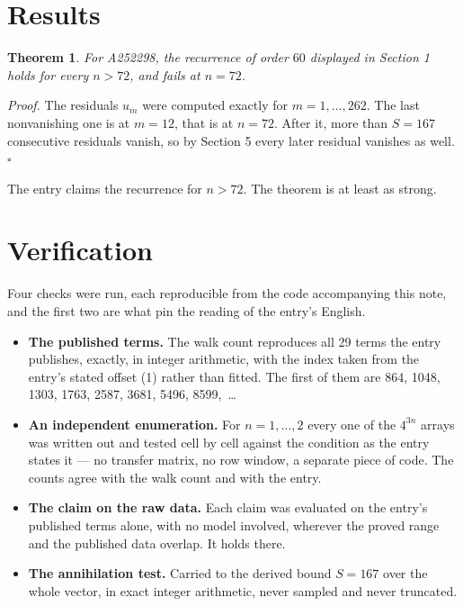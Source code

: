 \documentclass[11pt]{article}
\newtheorem{theorem}{Theorem}
\theoremstyle{definition}
\begin{document}
\section{Results}

\begin{theorem} For A252298, the recurrence of order $60$ displayed in Section 1 holds for every $n > 72$, and fails at $n = 72$.\end{theorem}

{\itshape Proof.} The residuals $u_m$ were computed exactly for $m = 1,\dots,262$. The last nonvanishing one is at $m = 12$, that is at $n = 72$. After it, more than $S = 167$ consecutive residuals vanish, so by Section 5 every later residual vanishes as well. $\square$

The entry claims the recurrence for $n > 72$. The theorem is at least as strong.

\section{Verification}

Four checks were run, each reproducible from the code accompanying this note, and the first two are what pin the reading of the entry's English.

\begin{itemize}

\item {\bfseries The published terms.} The walk count reproduces all 29 terms the entry publishes, exactly, in integer arithmetic, with the index taken from the entry's stated offset (1) rather than fitted. The first of them are 864, 1048, 1303, 1763, 2587, 3681, 5496, 8599,~\dots

\item {\bfseries An independent enumeration.} For $n = 1,\dots,2$ every one of the $4^{3n}$ arrays was written out and tested cell by cell against the condition as the entry states it --- no transfer matrix, no row window, a separate piece of code. The counts agree with the walk count and with the entry.

\item {\bfseries The claim on the raw data.} Each claim was evaluated on the entry's published terms alone, with no model involved, wherever the proved range and the published data overlap. It holds there.

\item {\bfseries The annihilation test.} Carried to the derived bound $S = 167$ over the whole vector, in exact integer arithmetic, never sampled and never truncated.

\end{itemize}
\end{document}
